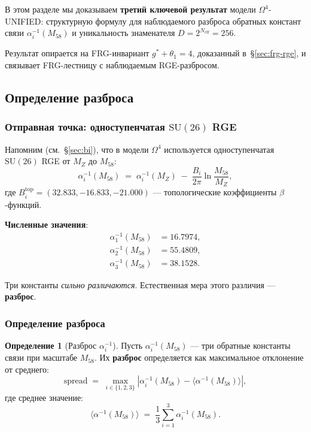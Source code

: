 \documentclass[11pt,a4paper]{article}
\newcommand{\SU}{\ensuremath{\mathrm{SU}}}
\newcommand{\Om}{\ensuremath{\Omega^4}}
\theoremstyle{definition}
\newtheorem{definition}[theorem]{Определение}
\begin{document}
В этом разделе мы доказываем \textbf{третий ключевой результат}
модели $\Om$-UNIFIED: структурную формулу для наблюдаемого разброса
обратных констант связи $\alpha_i^{-1}(M_{58})$ и уникальность
знаменателя $D = 2^{N_{\text{eff}}} = 256$.

Результат опирается на FRG-инвариант $g^* + \theta_1 = 4$,
доказанный в~\S\ref{sec:frg-rge}, и связывает FRG-лестницу
с наблюдаемым RGE-разбросом.

\subsection{Определение разброса}
\label{subsec:spread-def}

\subsubsection{Отправная точка: одноступенчатая \texorpdfstring{$\SU(26)$}{(26)} RGE}

Напомним (см.~\S\ref{sec:bi}), что в модели $\Om$ используется
одноступенчатая $\SU(26)$ RGE от $M_Z$ до $M_{58}$:
\begin{equation}
    \alpha_i^{-1}(M_{58}) \;=\; \alpha_i^{-1}(M_Z)
    \;-\; \frac{B_i}{2\pi} \ln\frac{M_{58}}{M_Z},
    \label{eq:rge-spread-recall}
\end{equation}
где $B_i^{\text{top}} = (32.833, -16.833, -21.000)$ ---
топологические коэффициенты $\beta$-функций.

\medskip\noindent
\textbf{Численные значения}:
\begin{align}
    \alpha_1^{-1}(M_{58}) &= 16.7974, \\
    \alpha_2^{-1}(M_{58}) &= 55.4809, \\
    \alpha_3^{-1}(M_{58}) &= 38.1528.
\end{align}

\medskip\noindent
Три константы \emph{сильно различаются}. Естественная мера
этого различия --- \textbf{разброс}.

\subsubsection{Определение разброса}

\begin{definition}[Разброс $\alpha_i^{-1}$]
\label{def:spread}
Пусть $\alpha_i^{-1}(M_{58})$ --- три обратные константы связи
при масштабе $M_{58}$. Их \textbf{разброс} определяется как
максимальное отклонение от среднего:
\begin{equation}
    \boxed{
    \text{spread} \;=\; \max_{i \in \{1,2,3\}}
    \left| \alpha_i^{-1}(M_{58})
    - \langle \alpha^{-1}(M_{58}) \rangle \right|,
    }
    \label{eq:spread-def}
\end{equation}
где среднее значение:
\begin{equation}
    \langle \alpha^{-1}(M_{58}) \rangle \;=\;
    \frac{1}{3} \sum_{i=1}^{3} \alpha_i^{-1}(M_{58}).
    \label{eq:spread-mean}
\end{equation}
\end{definition}
\end{document}
